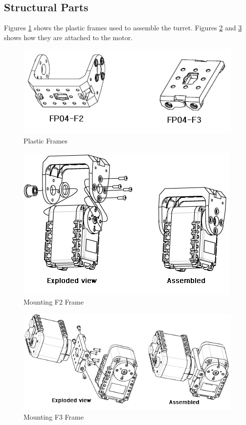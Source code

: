 \subsection{Structural Parts}
Figures \ref{fig:axFrames} shows the plastic frames used to assemble the turret. Figures \ref{fig:axMounting1} and \ref{fig:axMounting2} shows how they are attached to the motor.
\begin{figure}
	\centering
	\includegraphics[width=\textwidth]{img/axFrames.png}%
	\caption{Plastic Frames}
	\label{fig:axFrames}
\end{figure}
\begin{figure}
	\centering
	\includegraphics[width=\textwidth]{img/axMounting1.png}%
	\caption{Mounting F2 Frame}
	\label{fig:axMounting1}
\end{figure}
\begin{figure}
	\centering
	\includegraphics[width=\textwidth]{img/axMounting2.png}%
	\caption{Mounting F3 Frame}
	\label{fig:axMounting2}
\end{figure}
